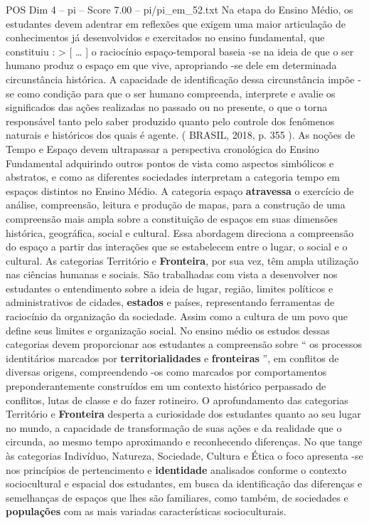 \begin{textsample}{POS Dim 4 – pi – Score 7.00 – pi/pi\_em\_52.txt}
Na etapa do Ensino Médio, os estudantes devem adentrar em reflexões que exigem uma maior articulação de conhecimentos já desenvolvidos e exercitados no ensino fundamental, que constituiu : > [ … ] o raciocínio espaço-temporal baseia -se na ideia de que o ser humano produz o espaço em que vive, apropriando -se dele em determinada circunstância histórica.
A capacidade de identificação dessa circunstância impõe -se como condição para que o ser humano compreenda, interprete e avalie os significados das ações realizadas no passado ou no presente, o que o torna responsável tanto pelo saber produzido quanto pelo controle dos fenômenos naturais e históricos dos quais é agente. ( BRASIL, 2018, p. 355 ).
As noções de Tempo e Espaço devem ultrapassar a perspectiva cronológica do Ensino Fundamental adquirindo outros pontos de vista como aspectos simbólicos e abstratos, e como as diferentes sociedades interpretam a categoria tempo em espaços distintos no Ensino Médio.
A categoria espaço \textbf{atravessa} o exercício de análise, compreensão, leitura e produção de mapas, para a construção de uma compreensão mais ampla sobre a constituição de espaços em suas dimensões histórica, geográfica, social e cultural.
Essa abordagem direciona a compreensão do espaço a partir das interações que se estabelecem entre o lugar, o social e o cultural.
As categorias Território e \textbf{Fronteira}, por sua vez, têm ampla utilização nas ciências humanas e sociais.
São trabalhadas com vista a desenvolver nos estudantes o entendimento sobre a ideia de lugar, região, limites políticos e administrativos de cidades, \textbf{estados} e países, representando ferramentas de raciocínio da organização da sociedade.
Assim como a cultura de um povo que define seus limites e organização social.
No ensino médio os estudos dessas categorias devem proporcionar aos estudantes a compreensão sobre “ os processos identitários marcados por \textbf{territorialidades} e \textbf{fronteiras} ”, em conflitos de diversas origens, compreendendo -os como marcados por comportamentos preponderantemente construídos em um contexto histórico perpassado de conflitos, lutas de classe e do fazer rotineiro.
O aprofundamento das categorias Território e \textbf{Fronteira} desperta a curiosidade dos estudantes quanto ao seu lugar no mundo, a capacidade de transformação de suas ações e da realidade que o circunda, ao mesmo tempo aproximando e reconhecendo diferenças.
No que tange às categorias Indivíduo, Natureza, Sociedade, Cultura e Ética o foco apresenta -se nos princípios de pertencimento e \textbf{identidade} analisados conforme o contexto sociocultural e espacial dos estudantes, em busca da identificação das diferenças e semelhanças de espaços que lhes são familiares, como também, de sociedades e \textbf{populações} com as mais variadas características socioculturais.

\end{textsample}
